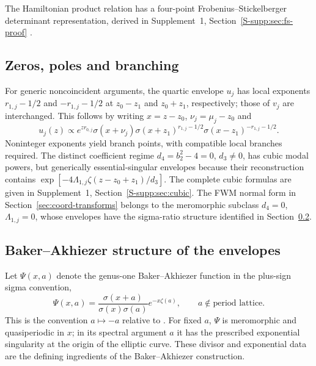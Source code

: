 \documentclass{optica-article}
\numberwithin{equation}{section}
\begin{document}

The Hamiltonian product relation has a four-point Frobenius--Stickelberger determinant representation, derived in Supplement~1, Section~\ref*{S-supp:sec:fs-proof} \cite{whittakerCourseModernAnalysis2021,frobeniusZurTheorieElliptischen1877}.

\subsection{Zeros, poles and branching}\label{sec:cubic-case}
For generic noncoincident arguments, the quartic envelope $u_j$ has local exponents $r_{1,j}-1/2$ and $-r_{1,j}-1/2$ at $z_0-z_1$ and $z_0+z_1$, respectively; those of $v_j$ are interchanged.
This follows by writing $x=z-z_0$, $\nu_j=\mu_j-z_0$ and
\begin{equation}
u_j(z)\propto e^{zr_{0,j}}\sigma(x+\nu_j)
\sigma(x+z_1)^{r_{1,j}-1/2}\sigma(x-z_1)^{-r_{1,j}-1/2}.
\end{equation}
Noninteger exponents yield branch points, with compatible local branches required.
The distinct coefficient regime $d_4=b_2^2-4=0$, $d_3\ne0$, has cubic modal powers, but generically essential-singular envelopes because their reconstruction contains $\exp[-4\Lambda_{1,j}\zeta(z-z_0+z_1)/d_3]$.
The complete cubic formulas are given in Supplement~1, Section~\ref*{S-supp:sec:cubic}.
The FWM normal form in Section~\ref{sec:coord-transforms} belongs to the meromorphic subclass $d_4=0$, $\Lambda_{1,j}=0$, whose envelopes have the sigma-ratio structure identified in Section~\ref{sec:elliptic-structure}.

\subsection{Baker--Akhiezer structure of the envelopes}\label{sec:elliptic-structure}
Let $\Psi(x,a)$ denote the genus-one Baker--Akhiezer function in the plus-sign sigma convention,
\begin{equation}
\Psi(x,a)=\frac{\sigma(x+a)}{\sigma(x)\sigma(a)}e^{-x\zeta(a)},
\qquad a\notin\text{period lattice}.
\label{eq:ba-kronecker}
\end{equation}
This is the convention $a\mapsto-a$ relative to \cite[Eq.~(1.7)]{kricheverEllipticSolutionsNonlinear1994}.
For fixed $a$, $\Psi$ is meromorphic and quasiperiodic in $x$; in its spectral argument $a$ it has the prescribed exponential singularity at the origin of the elliptic curve.
These divisor and exponential data are the defining ingredients of the Baker--Akhiezer construction.
\end{document}
